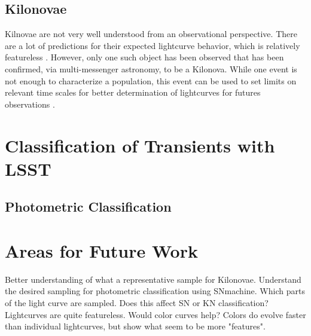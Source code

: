 \documentclass[11pt]{article}
\begin{document}
\subsection{Kilonovae}
Kilnovae are not very well understood from an observational perspective. There are a lot of predictions for their expected lightcurve behavior, which is relatively featureless \citep{Rosswog2016a}. However, only one such object has been observed that has been confirmed, via multi-messenger astronomy, to be a Kilonova. While one event is not enough to characterize a population, this event can be used to set limits on relevant time scales for better determination of lightcurves for futures observations \citep{Villar2017}. 
\section{Classification of Transients with LSST} %

\subsection{Photometric Classification}

\section{Areas for Future Work} %
Better understanding of what a representative sample for Kilonovae.
Understand the desired sampling for photometric classification using SNmachine. Which parts of the light curve are sampled. Does this affect SN or KN classification?
Lightcurves are quite featureless. Would color curves help? Colors do evolve faster than individual lightcurves, but show what seem to be more "features".




\end{document}
